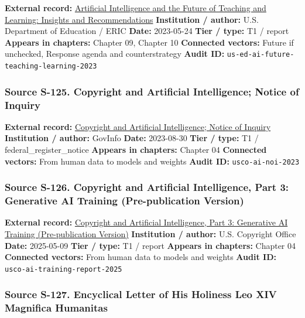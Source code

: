 \documentclass[
  american,
  11pt,
  letterpaper,
]{article}
\begin{document}
\textbf{External record:}
\href{https://eric.ed.gov/?id=ED631097}{Artificial Intelligence and the
Future of Teaching and Learning: Insights and Recommendations}
\textbf{Institution / author:} U.S. Department of Education / ERIC
\textbf{Date:} 2023-05-24 \textbf{Tier / type:} T1 / report
\textbf{Appears in chapters:} Chapter 09, Chapter 10 \textbf{Connected
vectors:} Future if unchecked, Response agenda and counterstrategy
\textbf{Audit ID:} \texttt{us-ed-ai-future-teaching-learning-2023}

\subsubsection{Source S-125. Copyright and Artificial Intelligence;
Notice of
Inquiry}\label{source-s-125-copyright-and-artificial-intelligence-notice-of-inquiry}

\textbf{External record:}
\href{https://www.govinfo.gov/content/pkg/FR-2023-08-30/pdf/2023-18624.pdf}{Copyright
and Artificial Intelligence; Notice of Inquiry} \textbf{Institution /
author:} GovInfo \textbf{Date:} 2023-08-30 \textbf{Tier / type:} T1 /
federal\_register\_notice \textbf{Appears in chapters:} Chapter 04
\textbf{Connected vectors:} From human data to models and weights
\textbf{Audit ID:} \texttt{usco-ai-noi-2023}

\subsubsection{Source S-126. Copyright and Artificial Intelligence, Part
3: Generative AI Training (Pre-publication
Version)}\label{source-s-126-copyright-and-artificial-intelligence-part-3-generative-ai-training-pre-publication-version}

\textbf{External record:}
\href{https://copyright.gov/ai/Copyright-and-Artificial-Intelligence-Part-3-Generative-AI-Training-Report-Pre-Publication-Version.pdf}{Copyright
and Artificial Intelligence, Part 3: Generative AI Training
(Pre-publication Version)} \textbf{Institution / author:} U.S. Copyright
Office \textbf{Date:} 2025-05-09 \textbf{Tier / type:} T1 / report
\textbf{Appears in chapters:} Chapter 04 \textbf{Connected vectors:}
From human data to models and weights \textbf{Audit ID:}
\texttt{usco-ai-training-report-2025}

\subsubsection{Source S-127. Encyclical Letter of His Holiness Leo XIV
Magnifica
Humanitas}\label{source-s-127-encyclical-letter-of-his-holiness-leo-xiv-magnifica-humanitas}
\end{document}

